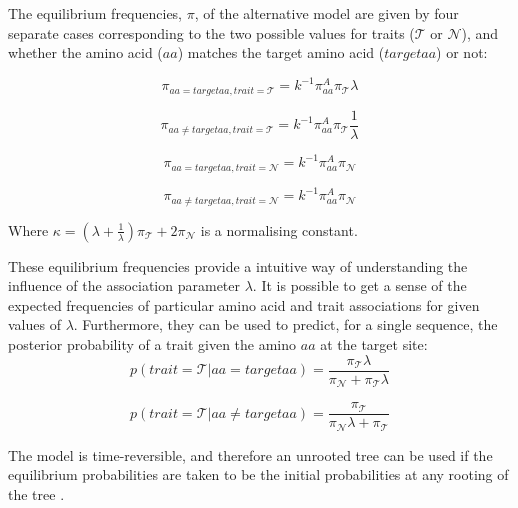 \documentclass[]{article}
\begin{document}
The equilibrium frequencies, $\pi$, of the alternative model are given by four separate cases corresponding to the two possible values for traits ($\mathcal{T}$ or $\mathcal{N}$), and whether the amino acid ($aa$) matches the target amino acid ($targetaa$) or not:

\begin{equation}
\pi_{aa=targetaa,trait=\mathcal{T}}=k^{-1}\pi_{aa}^{A}\pi_{\mathcal{T}}\lambda
\end{equation}

\begin{equation}
\pi_{aa\neq targetaa,trait=\mathcal{T}}=k^{-1}\pi_{aa}^{A}\pi_{\mathcal{T}}\frac{1}{\lambda}
\end{equation}

\begin{equation}
\pi_{aa=targetaa,trait=\mathcal{N}}=k^{-1}\pi_{aa}^{A}\pi_{\mathcal{N}}
\end{equation}

\begin{equation}
\pi_{aa\neq targetaa,trait=\mathcal{N}}=k^{-1}\pi_{aa}^{A}\pi_{\mathcal{N}}
\end{equation}

Where $\kappa=(\lambda+\frac{1}{\lambda})\pi_{\mathcal{T}}+2\pi_{\mathcal{N}}$ is a normalising constant.

These equilibrium frequencies provide a intuitive way of understanding the influence of the association parameter $\lambda$. It is possible to get a sense of the expected frequencies of particular amino acid and trait associations for given values of $\lambda$. Furthermore, they can be used to predict, for a single sequence, the posterior probability of a trait given the amino $aa$ at the target site:
\begin{equation}
p(trait=\mathcal{T}|aa=targetaa)=\frac{\pi_{\mathcal{T}}\lambda}{\pi_{\mathcal{N}}+\pi_{\mathcal{T}}\lambda}
\end{equation}

\begin{equation}
p(trait=\mathcal{T}|aa\neq targetaa)=\frac{\pi_{\mathcal{T}}}{\pi_{\mathcal{N}}\lambda+\pi_{\mathcal{T}}}
\end{equation}

The model is time-reversible, and therefore an unrooted tree can be used if the equilibrium probabilities are taken to be the initial probabilities at any rooting of the tree \citep{felsenstein1981evolutionary}.
\end{document}
